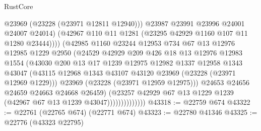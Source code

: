 \begin{lexlean}{RustCore}
\begin{coremodule}
                                  @23969
                                  (@23228 (@23971 @12811 @12940)))
                                @23987
                                @23991
                                @23996
                                @24001
                                @24007
                                @24014)
                              (@42967 @110 @11 @1281 (@23295 @42929 @1160 @107 @11 @1280 @23444))))
                          (@42985
                            @1160
                            @23244
                            @12953
                            @734
                            @67
                            @13
                            @12976
                            @12985
                            @1229
                            @2950
                            (@24529
                              @42929
                              @209
                              @426
                              @18
                              @13
                              @12976
                              @12983
                              @1554
                              (@43030
                                @200
                                @13
                                @17
                                @1239
                                @12975
                                @12982
                                @1337
                                @12958
                                @1343
                                @43047
                                (@43115
                                  @12968
                                  @1343
                                  @43107
                                  @43120
                                  @23969
                                  (@23228 (@23971 @12969 @1229)))
                                @23969
                                (@23228 (@23971 @12959 @12975)))
                              @24653
                              @24656
                              @24659
                              @24663
                              @24668
                              @26459)
                            (@23257
                              @42929
                              @67
                              @13
                              @1229
                              @1239
                              (@42967 @67 @13 @1239 @43047))))))))))))))
@43318 := @22759 @674
@43322 := @22761 (@22765 @674) (@22771 @674)
@43323 := @22780 @41346
@43325 := @22776 (@43323 @22795)

\end{coremodule}
\end{lexlean}
